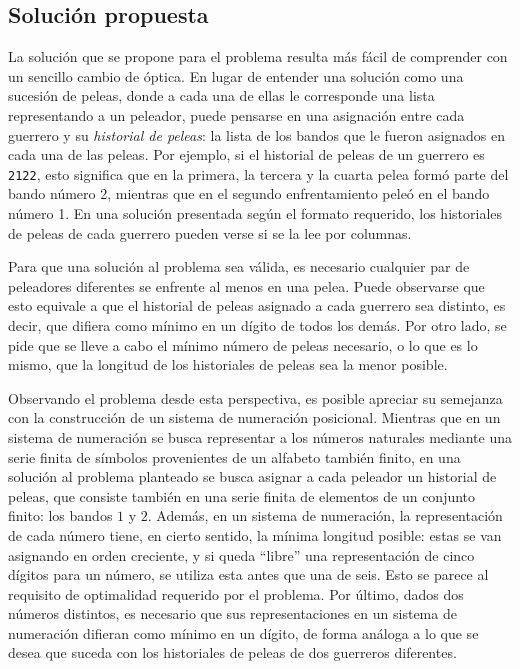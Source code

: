     \subsection{Solución propuesta}
        La solución que se propone para el problema resulta más fácil de comprender con un sencillo cambio de óptica. En lugar de entender una solución como una sucesión de peleas, donde a cada una de ellas le corresponde una lista representando a un peleador, puede pensarse en una asignación entre cada guerrero y su \emph{historial de peleas}: la lista de los bandos que le fueron asignados en cada una de las peleas. Por ejemplo, si el historial de peleas de un guerrero es \texttt{2122}, esto significa que en la primera, la tercera y la cuarta pelea formó parte del bando número 2, mientras que en el segundo enfrentamiento peleó en el bando número 1. En una solución presentada según el formato requerido, los historiales de peleas de cada guerrero pueden verse si se la lee por columnas.

        Para que una solución al problema sea válida, es necesario cualquier par de peleadores diferentes se enfrente al menos en una pelea. Puede observarse que esto equivale a que el historial de peleas asignado a cada guerrero sea distinto, es decir, que difiera como mínimo en un dígito de todos los demás. Por otro lado, se pide que se lleve a cabo el mínimo número de peleas necesario, o lo que es lo mismo, que la longitud de los historiales de peleas sea la menor posible.

        Observando el problema desde esta perspectiva, es posible apreciar su semejanza con la construcción de un sistema de numeración posicional. Mientras que en un sistema de numeración se busca representar a los números naturales mediante una serie finita de símbolos provenientes de un alfabeto también finito, en una solución al problema planteado se busca asignar a cada peleador un historial de peleas, que consiste también en una serie finita de elementos de un conjunto finito: los bandos $1$ y $2$. Además, en un sistema de numeración, la representación de cada número tiene, en cierto sentido, la mínima longitud posible: estas se van asignando en orden creciente, y si queda ``libre'' una representación de cinco dígitos para un número, se utiliza esta antes que una de seis. Esto se parece al requisito de optimalidad requerido por el problema. Por último, dados dos números distintos, es necesario que sus representaciones en un sistema de numeración difieran como mínimo en un dígito, de forma análoga a lo que se desea que suceda con los historiales de peleas de dos guerreros diferentes.

